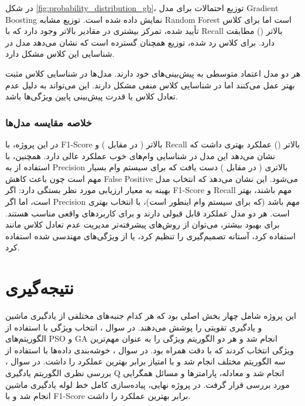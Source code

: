 \documentclass{article}
\begin{document}
در شکل \ref{fig:probability_distribution_gb}، توزیع احتمالات برای مدل Gradient Boosting نمایش داده شده است. توزیع مشابه Random Forest است اما برای کلاس تأیید شده، تمرکز بیشتری در مقادیر بالاتر وجود دارد که با Recall بالاتر () مطابقت دارد. برای کلاس رد شده، توزیع همچنان گسترده است که نشان می‌دهد مدل در شناسایی این کلاس مشکل دارد.

هر دو مدل اعتماد متوسطی به پیش‌بینی‌های خود دارند. مدل‌ها در شناسایی کلاس مثبت بهتر عمل می‌کنند اما در شناسایی کلاس منفی مشکل دارند. این می‌تواند به دلیل عدم تعادل کلاس یا قدرت پیش‌بینی پایین ویژگی‌ها باشد.

\subsubsection{خلاصه مقایسه مدل‌ها}

در این پروژه،  با F1-Score بالاتر ( در مقابل ) و Recall بالاتر () عملکرد بهتری داشت که نشان می‌دهد این مدل در شناسایی وام‌های خوب عملکرد عالی دارد. همچنین،  با استفاده از  به Precision بالاتری ( در مقابل ) دست یافت که برای سیستم وام بسیار مهم است چون باعث کاهش False Positive می‌شود. این نشان می‌دهد که انتخاب مدل بهینه به معیار ارزیابی مورد نظر بستگی دارد: اگر F1-Score و Recall مهم باشند،  بهتر است، اما اگر Precision مهم باشد (که برای سیستم وام اینطور است)،  با  انتخاب بهتری است. هر دو مدل عملکرد قابل قبولی دارند و برای کاربردهای واقعی مناسب هستند. برای بهبود بیشتر، می‌توان از روش‌های پیشرفته‌تر مدیریت عدم تعادل کلاس مانند  استفاده کرد، آستانه تصمیم‌گیری را تنظیم کرد، یا از ویژگی‌های مهندسی شده استفاده کرد.

\section{نتیجه‌گیری}\label{Section:Conclusion}

این پروژه شامل چهار بخش اصلی بود که هر کدام جنبه‌های مختلفی از یادگیری ماشین و یادگیری تقویتی را پوشش می‌دهند. در سوال ، انتخاب ویژگی با استفاده از الگوریتم‌های PSO و GA انجام شد و هر دو الگوریتم ویژگی  را به عنوان مهم‌ترین ویژگی انتخاب کردند که با دقت  همراه بود. در سوال ، خوشه‌بندی داده‌ها با استفاده از سه الگوریتم مختلف انجام شد و  با امتیاز  برابر  بهترین عملکرد را داشت. در سوال ، بررسی نظری الگوریتم یادگیری Q انجام شد و معادله، پارامترها و مسائل همگرایی مورد بررسی قرار گرفت. در پروژه نهایی، پیاده‌سازی کامل خط لوله یادگیری ماشین انجام شد و  با F1-Score برابر  بهترین عملکرد را داشت.
\end{document}
